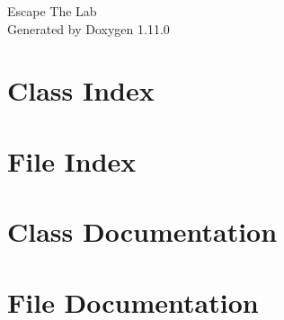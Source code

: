 \documentclass[twoside]{book}
\newcommand{\+}{\discretionary{\mbox{\scriptsize$\hookleftarrow$}}{}{}}
\newcommand{\clearemptydoublepage}{%
    \newpage{\pagestyle{empty}\cleardoublepage}%
  }
\begin{document}
  \raggedbottom
    \hypersetup{pageanchor=false,
                bookmarksnumbered=true,
                pdfencoding=unicode
               }
  \begin{titlepage}
  \vspace*{7cm}
  \begin{center}%
  {\Large Escape The Lab}\\
  \vspace*{1cm}
  {\large Generated by Doxygen 1.11.0}\\
  \end{center}
  \end{titlepage}
  \clearemptydoublepage
  \tableofcontents
  \clearemptydoublepage
  \hypersetup{pageanchor=true}
\chapter{Class Index}

\chapter{File Index}

\chapter{Class Documentation}


\chapter{File Documentation}


























































  \backmatter
  \newpage
  \clearemptydoublepage
  \printindex
\end{document}
